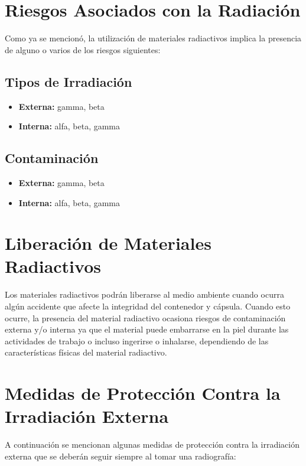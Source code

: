 \section*{Riesgos Asociados con la Radiación}

Como ya se mencionó, la utilización de materiales radiactivos implica la presencia de alguno o varios de los riesgos siguientes:

\subsection*{Tipos de Irradiación}
\begin{itemize}
    \item \textbf{Externa:} gamma, beta
    \item \textbf{Interna:} alfa, beta, gamma
\end{itemize}

\subsection*{Contaminación}
\begin{itemize}
    \item \textbf{Externa:} gamma, beta
    \item \textbf{Interna:} alfa, beta, gamma
\end{itemize}

\section*{Liberación de Materiales Radiactivos}
Los materiales radiactivos podrán liberarse al medio ambiente cuando ocurra algún accidente que afecte la integridad del contenedor y cápsula. Cuando esto ocurre, la presencia del material radiactivo ocasiona riesgos de contaminación externa y/o interna ya que el material puede embarrarse en la piel durante las actividades de trabajo o incluso ingerirse o inhalarse, dependiendo de las características físicas del material radiactivo.

\section*{Medidas de Protección Contra la Irradiación Externa}
A continuación se mencionan algunas medidas de protección contra la irradiación externa que se deberán seguir siempre al tomar una radiografía:


